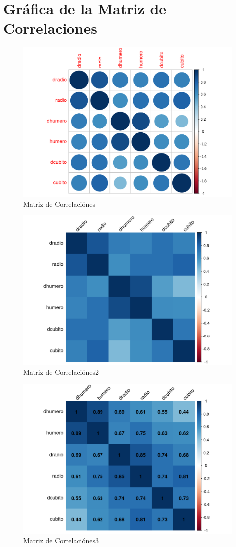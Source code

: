 \documentclass[12pt,a4paper,]{book}
\numberwithin{dummy}{section}
\theoremstyle{ocrenumbox}
\theoremstyle{ocrenumbox}
\theoremstyle{ocrenumbox}
\theoremstyle{ocrenumbox}
\theoremstyle{ocrenum}
\begin{document}
\hypertarget{gruxe1fica-de-la-matriz-de-correlaciones}{%
\section{Gráfica de la Matriz de
Correlaciones}\label{gruxe1fica-de-la-matriz-de-correlaciones}}

\begin{figure}[H]

{\centering \includegraphics[width=0.6\linewidth]{figurasR/grafica1i-1} 

}

\caption{Matriz de Correlaciónes}\label{fig:grafica1i}
\end{figure}

\begin{figure}[H]

{\centering \includegraphics[width=0.6\linewidth]{figurasR/grafica1j-1} 

}

\caption{Matriz de Correlaciónes2}\label{fig:grafica1j}
\end{figure}

\begin{figure}[H]

{\centering \includegraphics[width=0.6\linewidth]{figurasR/grafica1k-1} 

}

\caption{Matriz de Correlaciónes3}\label{fig:grafica1k}
\end{figure}
\end{document}
